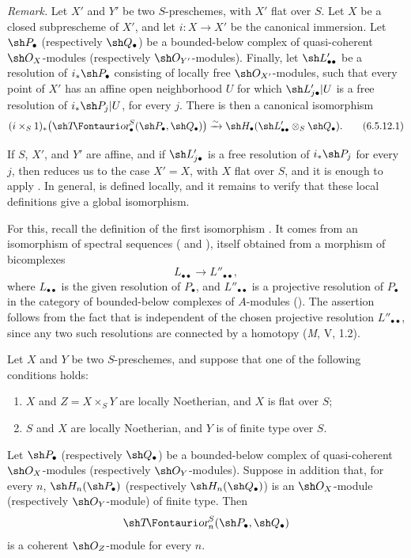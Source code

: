 \begin{env}[6.5.12]
\label{III.6.5.12}
\emph{Remark.}
Let $X'$ and $Y'$ be two $S$-preschemes, with $X'$ flat over
$S$.  Let $X$ be a closed subprescheme of $X'$, and let
$i:X\to X'$ be the canonical immersion.  Let $\sh P_\bullet$
(respectively $\sh Q_\bullet$) be a bounded-below complex of
quasi-coherent $\sh O_X$-modules (respectively
$\sh O_{Y'}$-modules).  Finally, let $\sh L'_{\bullet\bullet}$
be a resolution of $i_*\sh P_\bullet$ consisting of locally free
$\sh O_{X'}$-modules, such that every point of $X'$ has an
affine open neighborhood $U$ for which
$\sh L'_{j\bullet}|U$ is a free resolution of
$i_*\sh P_j|U$, for every $j$.  There is then a canonical
isomorphism
\[
  (i\times_S1)_*
  \bigl(\shTor_\bullet^S(\sh P_\bullet,\sh Q_\bullet)\bigr)
  \xrightarrow{\sim}
  \sh H_\bullet(\sh L'_{\bullet\bullet}\otimes_S\sh Q_\bullet).
  \tag{6.5.12.1}\label{III.6.5.12.1}
\]

If $S$, $X'$, and $Y'$ are affine, and if
$\sh L'_{j\bullet}$ is a free resolution of $i_*\sh P_j$ for
every $j$, then  reduces us to the case
$X'=X$, with $X$ flat over $S$, and it is enough to apply
.  In general,  is defined
locally, and it remains to verify that these local definitions
give a global isomorphism.

For this, recall the definition of the first isomorphism
.  It comes from an isomorphism of spectral
sequences ( and ), itself
obtained from a morphism of bicomplexes
\[
  L_{\bullet\bullet}\longrightarrow L''_{\bullet\bullet},
\]
where $L_{\bullet\bullet}$ is the given resolution of
$P_\bullet$, and
$L''_{\bullet\bullet}$ is a projective resolution of
$P_\bullet$ in the category of bounded-below complexes of
$A$-modules ().  The assertion follows from
the fact that  is independent of the chosen
projective resolution $L''_{\bullet\bullet}$, since any two such
resolutions are connected by a homotopy (\emph{M}, V, 1.2).
\end{env}

\begin{proposition}[6.5.13]
\label{III.6.5.13}
Let $X$ and $Y$ be two $S$-preschemes, and suppose that one of
the following conditions holds:
\begin{enumerate}
  \item[(i)] $X$ and $Z=X\times_SY$ are locally Noetherian, and
    $X$ is flat over $S$;
  \item[(ii)] $S$ and $X$ are locally Noetherian, and $Y$ is of
    finite type over $S$.
\end{enumerate}
Let $\sh P_\bullet$ (respectively $\sh Q_\bullet$) be a
bounded-below complex of quasi-coherent $\sh O_X$-modules
(respectively $\sh O_Y$-modules).  Suppose in addition that, for
every $n$, $\sh H_n(\sh P_\bullet)$ (respectively
$\sh H_n(\sh Q_\bullet)$) is an $\sh O_X$-module
(respectively $\sh O_Y$-module) of finite type.  Then
\[
  \shTor_n^S(\sh P_\bullet,\sh Q_\bullet)
\]
is a coherent $\sh O_Z$-module for every $n$.
\end{proposition}

